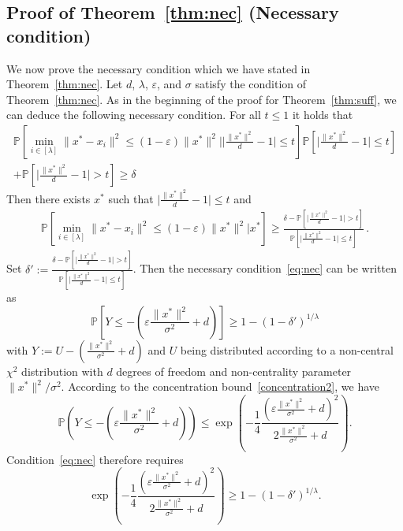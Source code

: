 \begin{subappendices}
\section{Proof of Theorem~\ref{thm:nec} (Necessary condition)}
\label{sec:nec}
\begin{prv*}
We now prove the necessary condition which we have stated in Theorem~\ref{thm:nec}.
Let $d$, $\lambda$, $\varepsilon$, and $\sigma$ satisfy the condition of Theorem~\ref{thm:nec}.  
As in the beginning of the proof for Theorem~\ref{thm:suff}, we can deduce the following necessary condition. For all $t\leq1$ it holds that 
\begin{align*}
    \mathbb{P}\left[\min_{i\in[\lambda]}\lVert x^*-x_i\rVert^2 \leq \left(1-\varepsilon\right)\lVert x^*\rVert^2\big| \lvert\frac{\lVert x^*\rVert^2}{d}-1\rvert\leq t\right]
  \mathbb{P}\left[\lvert\frac{\lVert x^*\rVert^2}{d}-1\rvert\leq t\right]\\
  +\mathbb{P}\left[\lvert\frac{\lVert x^*\rVert^2}{d}-1\rvert> t\right]\geq \delta
\end{align*}
Then there exists $x^*$ such that $\lvert\frac{\lVert x^*\rVert^2}{d}-1\rvert\leq t$ and 
\begin{eqnarray}
\mathbb{P}\left[\min_{i\in[\lambda]}\lVert x^*-x_i\rVert^2 \leq \left(1-\varepsilon\right)\lVert x^*\rVert^2\big| x^*\right]
  \geq\frac{\delta- \mathbb{P}\left[\lvert\frac{\lVert x^*\rVert^2}{d}-1\rvert > t\right]}{ \mathbb{P}\left[\lvert\frac{\lVert x^*\rVert^2}{d}-1\rvert\leq t\right]}\,. 
\label{eq:nec}
\end{eqnarray}
Set $\delta' := \frac{\delta- \mathbb{P}\left[\lvert\frac{\lVert x^*\rVert^2}{d}-1\rvert > t\right]}{ \mathbb{P}\left[\lvert\frac{\lVert x^*\rVert^2}{d}-1\rvert\leq t\right]} $. 
Then the necessary condition~\eqref{eq:nec} can be written as
$$\mathbb{P}\left[Y\leq -\left(\varepsilon\frac{\lVert x^*\rVert^2}{\sigma^2}+d\right)\right]\geq1-(1-\delta')^{1/\lambda}$$
with $Y := U-(\frac{\lVert x^*\rVert^2}{\sigma^2}+d)$ and 
$U$ being distributed according to a non-central $\chi^2$ distribution with $d$ degrees of freedom and non-centrality parameter $\lVert x^*\rVert^2/\sigma^2$.
According to the concentration bound~\eqref{concentration2}, we have 
$$\mathbb{P}\left(Y\leq -\left(\varepsilon\frac{\lVert x^*\rVert^2}{\sigma^2}+d\right)\right) \leq\exp{\left(-\frac14 \frac{(\varepsilon\frac{\lVert x^*\rVert^2}{\sigma^2}+d)^2}{2\frac{\lVert x^*\rVert^2}{\sigma^2}+d}\right)}.$$
%
Condition~\eqref{eq:nec} therefore requires   
$$ \exp{\left(-\frac14 \frac{(\varepsilon\frac{\lVert x^*\rVert^2}{\sigma^2}+d)^2}{2\frac{\lVert x^*\rVert^2}{\sigma^2}+d}\right)}\geq1-(1-\delta')^{1/\lambda}.$$

\end{prv*}
\end{subappendices}
